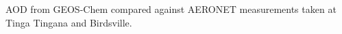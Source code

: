 \label{fig:AODComparison}
AOD from GEOS-Chem compared against AERONET measurements taken at Tinga Tingana and Birdsville.
